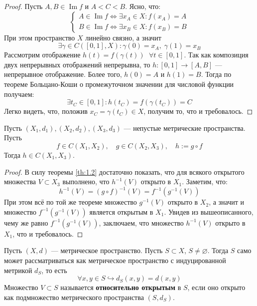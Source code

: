 \documentclass[11pt]{article}
\DeclareMathOperator{\Imm}{Im}
\begin{document}
\begin{proof}
    Пусть $A, B \in \Imm f$ и $A < C < B$. Ясно, что:
    \begin{equation*}
        \begin{cases}
            A \in \Imm f \iff \exists x_A \in X: f(x_A) = A \\
            B \in \Imm f \iff \exists x_B \in X: f(x_B) = B 
        \end{cases}
    \end{equation*}
    При этом пространство $X$ линейно связно, а значит 
    \[\exists \gamma \in C([0, 1], X): \gamma(0) = x_A, \; \gamma(1) = x_B\]
    Рассмотрим отображение $h(t) = f(\gamma(t))$ $ \; \forall t \in [0, 1]$. Так как 
    композиция двух непрерывных отображений непрерывна, то $h \colon [0, 1] \to [A, B]$ --- непрерывное отображение.
    Более того, $h(0) = A$ и $h(1) = B$. Тогда по теореме Больцано-Коши о промежуточном
    значении для числовой функции получаем:
    \[\exists t_C \in [0, 1]: h(t_C) = f(\gamma(t_C)) = C\]
    Легко видеть, что, положив $x_C = \gamma(t_C) \in X$, получим то, что и требовалось.
\end{proof}

\begin{theorem}
    Пусть $(X_1, d_1), (X_2, d_2), (X_3, d_3)$ --- непустые метрические пространства. Пусть 
    \[f \in C(X_1, X_2), \quad g \in C(X_2, X_3), \quad h := g \circ f\]
    Тогда $h \in  C(X_1, X_3)$. 
\end{theorem}

\begin{proof}
    В силу теоремы \ref{th:1.2} достаточно показать, что для всякого открытого множества
    $V \subset X_3$ выполнено, что $h^{-1}(V)$ открыто в $X_1$. Заметим, что:
    \[h^{-1}(V) = (g \circ f)^{-1}(V) = f^{-1}(g^{-1}(V))\]
    При этом всё по той же теореме множество $g^{-1}(V)$ открыто в $X_2$, а значит и множество $f^{-1}(g^{-1}(V))$ является открытым в $X_1$.
    Увидев из вышеописанного, чему же равно $f^{-1}(g^{-1}(V))$, заключаем, что множество $h^{-1}(V)$ открыто в $X_1$, что и требовалось.
\end{proof}

\begin{definition}
    Пусть $(X, d)$ --- метрическое пространство. Пусть $S \subset X$, $S \neq \varnothing$. Тогда $S$ само может 
    рассматриваться как метрическое пространство с индуцированной метрикой $d_S$, то есть 
    \[\forall x, y \in S \hookrightarrow d_S(x, y) = d(x, y)\]
    Множество $V \subset S$ называется \textbf{относительно открытым} в $S$, если оно открыто как подмножество метрического пространства $(S, d_S)$.
\end{definition}
\end{document}

